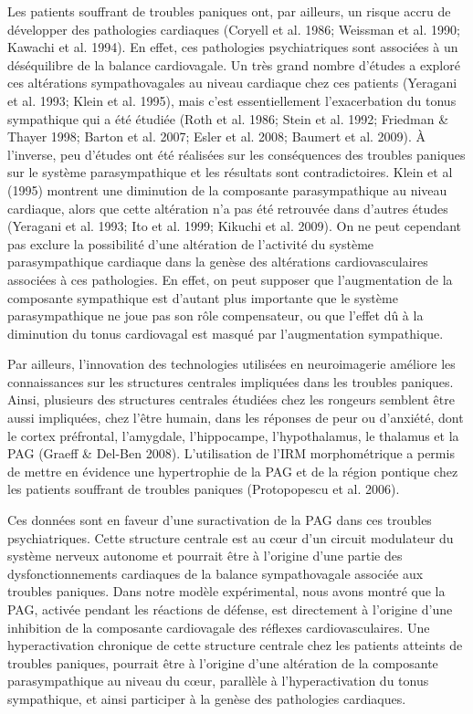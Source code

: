 \documentclass[a4paper,12pt,twoside]{report}
\begin{document}
Les patients souffrant de troubles paniques ont, par ailleurs, un risque accru de développer des pathologies cardiaques (Coryell et al. 1986; Weissman et al. 1990; Kawachi et al. 1994). En effet, ces pathologies psychiatriques sont associées à un déséquilibre de la balance cardiovagale. Un très grand nombre d’études a exploré ces altérations sympathovagales au niveau cardiaque chez ces patients (Yeragani et al. 1993; Klein et al. 1995), mais c’est essentiellement l’exacerbation du tonus sympathique qui a été étudiée (Roth et al. 1986; Stein et al. 1992; Friedman \& Thayer 1998; Barton et al. 2007; Esler et al. 2008; Baumert et al. 2009). À l’inverse, peu d’études ont été réalisées sur les conséquences des troubles paniques sur le système parasympathique et les résultats sont contradictoires. Klein et al (1995) montrent une diminution de la composante parasympathique au niveau cardiaque, alors que cette altération n’a pas été retrouvée dans d’autres études (Yeragani et al. 1993; Ito et al. 1999; Kikuchi et al. 2009). On ne peut cependant pas exclure la possibilité d’une altération de l’activité du système parasympathique cardiaque dans la genèse des altérations cardiovasculaires associées à ces pathologies. En effet, on peut supposer que l’augmentation de la composante sympathique est d’autant plus importante que le système parasympathique ne joue pas son rôle compensateur, ou que l’effet dû à la diminution du tonus cardiovagal est masqué par l’augmentation sympathique. 

Par ailleurs, l’innovation des technologies utilisées en neuroimagerie améliore les connaissances sur les structures centrales impliquées dans les troubles paniques. Ainsi, plusieurs des structures centrales étudiées chez les rongeurs semblent être aussi impliquées, chez l’être humain, dans les réponses de peur ou d’anxiété, dont le cortex préfrontal, l’amygdale, l’hippocampe, l’hypothalamus, le thalamus et la PAG (Graeff \& Del-Ben 2008). L’utilisation de l’IRM morphométrique a permis de mettre en évidence une hypertrophie de la PAG et de la région pontique chez les patients souffrant de troubles paniques (Protopopescu et al. 2006). 

Ces données sont en faveur d’une suractivation de la PAG dans ces troubles psychiatriques. Cette structure centrale est au cœur d’un circuit modulateur du système nerveux autonome et pourrait être à l’origine d’une partie des dysfonctionnements cardiaques de la balance sympathovagale associée aux troubles paniques. Dans notre modèle expérimental, nous avons montré que la PAG, activée pendant les réactions de défense, est directement à l’origine d’une inhibition de la composante cardiovagale des réflexes cardiovasculaires. Une hyperactivation chronique de cette structure centrale chez les patients atteints de troubles paniques, pourrait être à l’origine d’une altération de la composante parasympathique au niveau du cœur, parallèle à l’hyperactivation du tonus sympathique, et ainsi participer à la genèse des pathologies cardiaques. 
\end{document}
